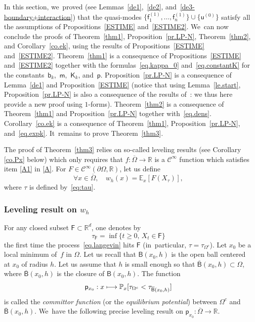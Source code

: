 \documentclass[JEP,XML,SOM,Unicode,NoEqCountersInSection,NoFloatCountersInSection,published]{cedram}
\newcommand\mto{\mathchoice{\longmapsto}{\mapsto}{\mapsto}{\mapsto}}
\theoremstyle{plain}
\theoremstyle{definition}
\begin{document}
In this section, we~proved (see Lemmas~\ref{de1},~\ref{de2}, and~\ref{de3-boundary+interaction}) that the quasi-modes $\{\mathsf f_1^{(1)}, \ldots, \mathsf f_n^{(1)}\} \cup \{ \mathsf u^{(0)} \}$ satisfy all the assumptions of
Propositions~\ref{ESTIME} and~\ref{ESTIME2}. We~can now conclude the proofs of Theorem~\ref{thm1}, Proposition~\ref{pr.LP-N}, Theorem~\ref{thm2}, and Corollary~\ref{co.ek}, using the results of Propositions~\ref{ESTIME} and~\ref{ESTIME2}.
Theorem~\ref{thm1} is a consequence of Propositions~\ref{ESTIME}
and~\ref{ESTIME2} together with the formulas~\eqref{eq.kappa_0}
and~\eqref{eq.constantK} for the constants~$\mathsf b_k$,~$\mathsf
m$,~$\mathsf K_k$, and~$\mathsf p$. Proposition~\ref{pr.LP-N} is a
consequence of Lemma~\ref{de1} and
Proposition~\ref{ESTIME} (notice
that using Lemma~\ref{le.start}, Proposition~\ref{pr.LP-N} is also a
consequence of the results of~\cite{DoNe2}: we thus here provide a new
proof using $1$-forms). Theorem~\ref{thm2} is a consequence of
Theorem~\ref{thm1} and Proposition~\ref{pr.LP-N} together
with~\eqref{eq.dens}. Corollary~\ref{co.ek} is a consequence of
Theorem~\ref{thm1}, Proposition~\ref{pr.LP-N},
and~\eqref{eq.expk}. It~remains to prove Theorem~\ref{thm3}.

\label{sec.proof}

The proof of Theorem~\ref{thm3} relies on so-called leveling results (see Corollary \ref{co.Px} below) which only requires that $f:\overline \Omega\to \mathbb R$ is a $\mathcal C^\infty$ function which satisfies item \eqref{A1} in \ref{A}. For $F\in\mathcal C^{\infty}(\partial \Omega,\mathbb R)$, let us define\vspace*{-3pt}
\begin{equation}\label{eq.wh}
\forall x\in \overline
\Omega, \quad
w_h(x)=\mathbb
E_{x} [ F (X_{\tau})],
\end{equation}
where $\tau$ is defined by~\eqref{eq:tau}.

\subsubsection{{Leveling result} on $w_h$}
For any {closed} subset $\mathsf F \subset \mathbb R^d$, one denotes by
\[
\tau_{\mathsf F}=\inf \{ t\geq 0,\, X_t \in \mathsf F
\}
\]
the first time the process~\eqref{eq.langevin} hits $\mathsf F$
(in~particular, $\tau=\tau_{\Omega^c}$).
Let $x_0$ be a local minimum of~$f$ in $\Omega$. Let us recall that ${\mathsf B(x_0,h)}$ is the open ball centered at $x_0$ of radius $h$.
Let us assume that $h$ is small enough so that $ \overline{\mathsf B}(x_0,h)\subset \Omega$, where $ \overline{\mathsf B}(x_0,h)$ is the closure of ${\mathsf B}(x_0,h)$.
The function
\[
\mathsf p_{x_0}: x\mto \mathbb P_{x}[ \tau_{\Omega^c}<\tau_{ \overline{\mathsf B}(x_0,h)}]
\]
is called the \textit{committor function} (or the \textit{equilibrium potential}) between $\Omega^c$ and $ \overline{\mathsf B}(x_0,h)$. We~have the following precise leveling result on $\mathsf p_{x_0}:\overline \Omega\to \mathbb R$.
\end{document}
